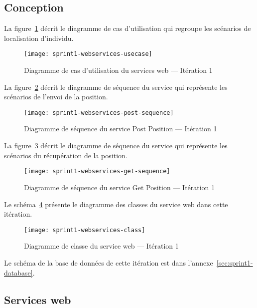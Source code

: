 \subsection{Conception}

La figure~\ref{fig:sprint1-webservices-usecase} décrit le diagramme
de cas d'utilisation qui regroupe les scénarios de localisation d'individu.

\begin{figure}[H]
    \centering
    \texttt{[image: sprint1-webservices-usecase]}
    \caption{Diagramme de cas d'utilisation du services web --- Itération 1}
\label{fig:sprint1-webservices-usecase}
\end{figure}

La figure~\ref{fig:sprint1-webservices-post-sequence} décrit le diagramme de
séquence du service  qui représente les scénarios de
l'envoi de la position.

\begin{figure}[H]
    \centering
    \texttt{[image: sprint1-webservices-post-sequence]}
    \caption{Diagramme de séquence du service Post Position --- Itération 1}
\label{fig:sprint1-webservices-post-sequence}
\end{figure}

La figure~\ref{fig:sprint1-webservices-get-sequence} décrit le diagramme de
séquence du service  qui représente les scénarios du
récupération de la position.

\begin{figure}[H]
    \centering
    \texttt{[image: sprint1-webservices-get-sequence]}
    \caption{Diagramme de séquence du service Get Position --- Itération 1}
\label{fig:sprint1-webservices-get-sequence}
\end{figure}

Le schéma~\ref{fig:sprint1-webservices-class} présente le diagramme des classes
du service web dans cette itération.

\begin{figure}[H]
    \centering
    \texttt{[image: sprint1-webservices-class]}
    \caption{Diagramme de classe du service web --- Itération 1}
\label{fig:sprint1-webservices-class}
\end{figure}

Le schéma de la base de données de cette itération est dans
l'annexe~\ref{sec:sprint1-database}.

\subsection{Services web}

